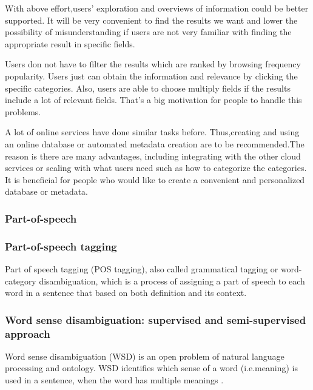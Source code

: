 With above effort,users' exploration and overviews of information could be better supported. 
It will be very convenient to find the results we want and lower the possibility of misunderstanding if users are not very familiar with finding the appropriate result in specific fields.

\cite{TunThuraThet2010} Users don not have to filter the results which are ranked by browsing frequency popularity. 
Users just can obtain the information and relevance by clicking the specific categories. 
Also, users are able to choose multiply fields if the results include a lot of relevant fields. 
That's a big motivation for people to handle this problems. 

A lot of online services have done similar tasks before.
Thus,creating and using an online database or automated metadata creation are to be recommended.The reason is there are many advantages, including integrating with the other cloud services or scaling with what users need such as how to categorize the categories.
It is beneficial for people who would like to create a convenient and personalized database or metadata.\\

\subsubsection*{Part-of-speech}



\subsubsection*{Part-of-speech tagging}

Part of speech tagging (POS tagging), also called grammatical tagging or word-category disambiguation, which is a process of assigning a part of speech to each word in a sentence that based on both definition and its context.\\
 
\subsubsection*{Word sense disambiguation: supervised and semi-supervised approach}

Word sense disambiguation (WSD) is an open problem of natural language processing and ontology. 
WSD identifies which sense of a word (i.e.meaning) is used in a sentence,
when the word has multiple meanings \cite{Du2013}. 

